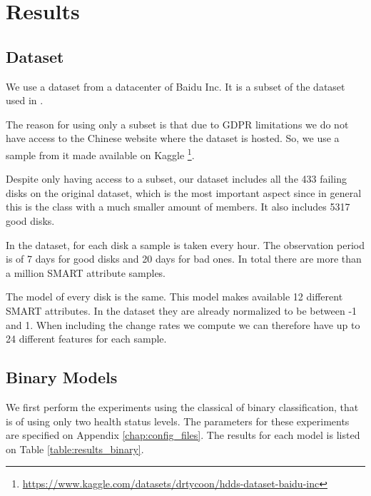 \chapter{Results}\label{chap:results}


\section{Dataset}

We use a dataset from a datacenter of Baidu Inc.
It is a subset of the dataset used in \cite{Zhu13}.

The reason for using only a subset is that due to GDPR limitations we do not have access to the Chinese website where the dataset is hosted.
So, we use a sample from it made available on Kaggle \footnote{\url{https://www.kaggle.com/datasets/drtycoon/hdds-dataset-baidu-inc}}.

Despite only having access to a subset, our dataset includes all the 433 failing disks on the original dataset, which is the most important aspect since in general this is the class with a much smaller amount of members.
It also includes 5317 good disks.

In the dataset, for each disk a sample is taken every hour.
The observation period is of 7 days for good disks and 20 days for bad ones.
In total there are more than a million SMART attribute samples.

The model of every disk is the same.
This model makes available 12 different SMART attributes.
In the dataset they are already normalized to be between -1 and 1.
When including the change rates we compute we can therefore have up to 24 different features for each sample.

\section{Binary Models}

We first perform the experiments using the classical of binary classification, that is of using only two health status levels.
The parameters for these experiments are specified on Appendix \ref{chap:config_files}.
The results for each model is listed on Table \ref{table:results_binary}.

